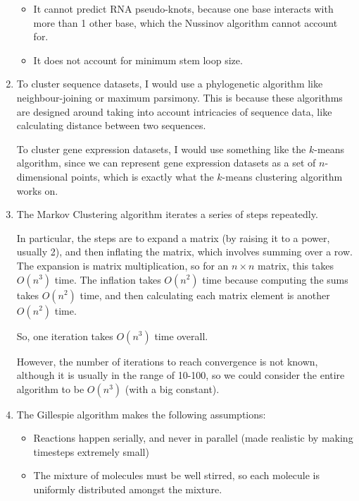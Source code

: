 \begin{enumerate}[label=(\alph*)]
\begin{itemize}
      \item
        It cannot predict RNA pseudo-knots, because one base interacts with more than 1 other base, which the Nussinov algorithm cannot account for.

      \item
        It does not account for minimum stem loop size.
    \end{itemize}

  \item
    To cluster sequence datasets, I would use a phylogenetic algorithm like neighbour-joining or maximum parsimony. This is because these algorithms are designed around taking into account intricacies of sequence data, like calculating distance between two sequences.

    To cluster gene expression datasets, I would use something like the $k$-means algorithm, since we can represent gene expression datasets as a set of $n$-dimensional points, which is exactly what the $k$-means clustering algorithm works on.

  \item
    The Markov Clustering algorithm iterates a series of steps repeatedly.

    In particular, the steps are to expand a matrix (by raising it to a power, usually 2), and then inflating the matrix, which involves summing over a row. The expansion is matrix multiplication, so for an $n \times n$ matrix, this takes $O(n^3)$ time. The inflation takes $O(n^2)$ time because computing the sums takes $O(n^2)$ time, and then calculating each matrix element is another $O(n^2)$ time.

    So, one iteration takes $O(n^3)$ time overall.

    However, the number of iterations to reach convergence is not known, although it is usually in the range of 10-100, so we could consider the entire algorithm to be $O(n^3)$ (with a big constant).

  \item
    The Gillespie algorithm makes the following assumptions:

    \begin{itemize}
      \item
        Reactions happen serially, and never in parallel (made realistic by making timesteps extremely small)

      \item
        The mixture of molecules must be well stirred, so each molecule is uniformly distributed amongst the mixture.


\end{itemize}
\end{enumerate}
